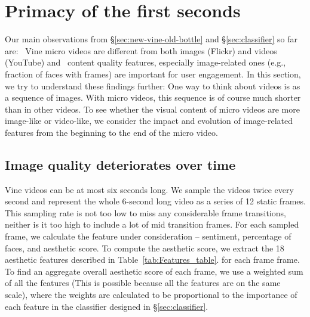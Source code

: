 \section{Primacy of the first seconds}

Our main observations from \S\ref{sec:new-vine-old-bottle} and \S\ref{sec:classifier} so far are: \one\ Vine micro videos are different from both images (Flickr) and videos (YouTube) and \two\  content quality features, especially image-related ones (e.g., fraction of faces with frames) are  important for user engagement. %
In this section, we try to understand these findings further: One way to think about videos is as a sequence of images. With micro videos, this sequence is of course much shorter than in other videos. To see whether the visual content of micro videos are more image-like or video-like, we consider the impact and evolution of image-related features from the beginning to the end of the micro video. 

\subsection{Image quality deteriorates over time}




Vine videos can be at most six seconds long. We sample the videos twice every second and represent the whole 6-second long video as a series of 12 static frames. This sampling rate is not too low to miss any considerable frame transitions, neither is it too high to include a lot of mid transition frames. For each sampled frame, we calculate the feature under consideration -- sentiment, percentage of faces, and aesthetic score. To compute the aesthetic score, we extract the 18 aesthetic features described in Table~\ref{tab:Features_table}. for each frame frame. To find an aggregate overall aesthetic score of each frame, we use a weighted sum of all the features (This is possible because all the features are on the same scale), where the weights are calculated to be proportional to the importance of each feature in the classifier designed in \S\ref{sec:classifier}. 


